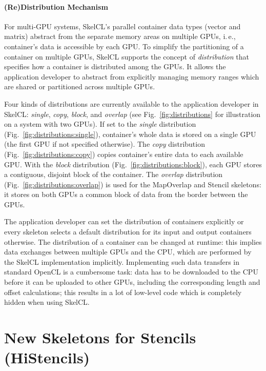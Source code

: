 \pagebreak
\paragraph{(Re)Distribution Mechanism}
For multi-GPU systems, SkelCL's parallel container data types (vector and matrix) abstract from the separate memory areas on multiple GPUs, i.\,e., container's data is accessible by each GPU.
To simplify the partitioning of a container on multiple GPUs, SkelCL supports the concept of \emph{distribution} that specifies how a container is distributed among the GPUs.
It allows the application developer to abstract from explicitly managing memory ranges which are shared or partitioned across multiple GPUs.

Four kinds of distributions are currently available to the application developer in SkelCL:
\emph{single}, \emph{copy}, \emph{block}, and \emph{overlap} (see Fig.~\ref{fig:distributions} for illustration on a system with two GPUs).
If set to the \emph{single} distribution (Fig.~\ref{fig:distributions:single}), container's whole data is stored on a single GPU (the first GPU if not specified otherwise).
The \emph{copy} distribution (Fig.~\ref{fig:distributions:copy}) copies container's entire data to each available GPU.
With the \emph{block} distribution (Fig.~\ref{fig:distributions:block}), each GPU stores a contiguous, disjoint block of the container.
The \emph{overlap} distribution (Fig.~\ref{fig:distributions:overlap}) is used for the MapOverlap and Stencil skeletons:
it stores on both GPUs a common block of data from the border between the GPUs.

The application developer can set the distribution of containers explicitly or every skeleton selects a default distribution for its input and output containers otherwise.
The distribution of a container can be changed at runtime:
this implies data exchanges between multiple GPUs and the CPU, which are performed by the SkelCL implementation implicitly.
Implementing such data transfers in standard OpenCL is a cumbersome task:
data has to be downloaded to the CPU before it can be uploaded to other GPUs, including the corresponding length and offset calculations;
this results in a lot of low-level code which is completely hidden when using SkelCL.

\section{New Skeletons for Stencils (HiStencils)}
\label{sec:stencil}

